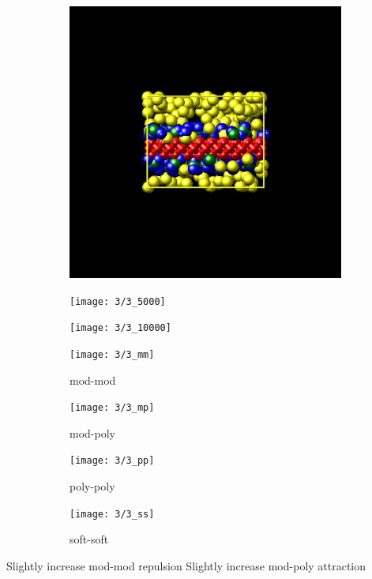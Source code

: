 \documentclass[a4paper]{article}
\begin{document}
\begin{figure}[H]
\begin{subfigure}{0.3\textwidth}
  \centering
  \includegraphics[width=\linewidth,keepaspectratio]{start}
  \caption{}
\end{subfigure}
\begin{subfigure}{0.3\textwidth}
  \centering
  \texttt{[image: 3/3\_5000]}
  \caption{}
\end{subfigure}
\begin{subfigure}{0.3\textwidth}
  \centering
  \texttt{[image: 3/3\_10000]}
  \caption{}
\end{subfigure}
\caption{}
\label{fig_1}
\end{figure}

\begin{figure}[H]
\begin{subfigure}{0.24\textwidth}
  \centering
  \texttt{[image: 3/3\_mm]}
  \caption{mod-mod}
\end{subfigure}
\begin{subfigure}{0.24\textwidth}
  \centering
  \texttt{[image: 3/3\_mp]}
  \caption{mod-poly}
\end{subfigure}
\begin{subfigure}{0.24\textwidth}
  \centering
  \texttt{[image: 3/3\_pp]}
  \caption{poly-poly}
\end{subfigure}
\begin{subfigure}{0.24\textwidth}
  \centering
  \texttt{[image: 3/3\_ss]}
  \caption{soft-soft}
\end{subfigure}
\caption{}
\label{fig_1}
\end{figure}
Slightly increase mod-mod repulsion\newline
Slightly increase mod-poly attraction
\end{document}
